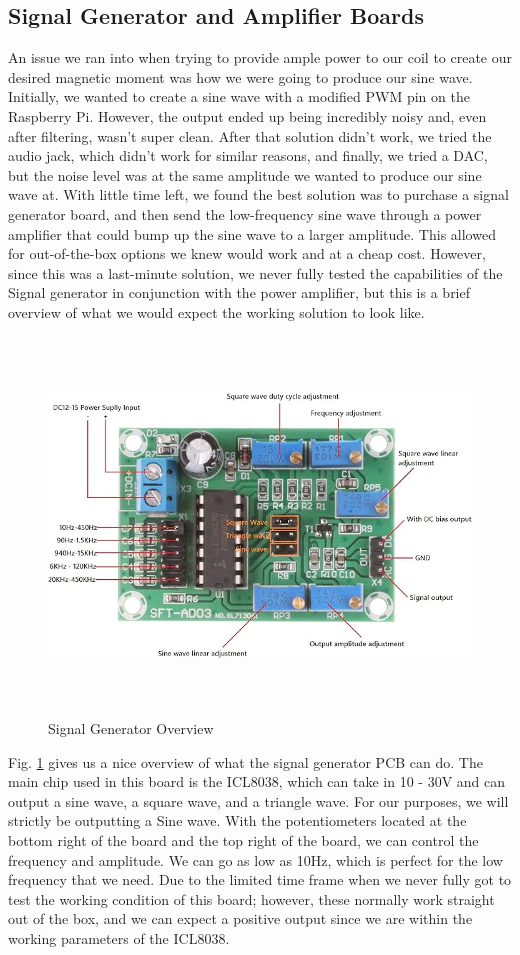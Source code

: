 \subsection{Signal Generator and Amplifier Boards}
An issue we ran into when trying to provide ample power to our coil to create our desired magnetic moment was how we were going to produce our sine wave. Initially, we wanted to create a sine wave with a modified PWM pin on the Raspberry Pi. However, the output ended up being incredibly noisy and, even after filtering, wasn't super clean. After that solution didn't work, we tried the audio jack, which didn't work for similar reasons, and finally, we tried a DAC, but the noise level was at the same amplitude we wanted to produce our sine wave at. With little time left, we found the best solution was to purchase a signal generator board, and then send the low-frequency sine wave through a power amplifier that could bump up the sine wave to a larger amplitude. This allowed for out-of-the-box options we knew would work and at a cheap cost. However, since this was a last-minute solution, we never fully tested the capabilities of the Signal generator in conjunction with the power amplifier, but this is a brief overview of what we would expect the working solution to look like.
\begin{figure}[H]
    \centering
    \includegraphics[height=10cm]{Signal Generator.jpg}
    \caption{Signal Generator Overview}
    \label{fig:Signal Generator}
\end{figure}
Fig. \ref{fig:Signal Generator} gives us a nice overview of what the signal generator PCB can do. The main chip used in this board is the ICL8038, which can take in 10 - 30V and can output a sine wave, a square wave, and a triangle wave. For our purposes, we will strictly be outputting a Sine wave. With the potentiometers located at the bottom right of the board and the top right of the board, we can control the frequency and amplitude. We can go as low as 10Hz, which is perfect for the low frequency that we need. Due to the limited time frame when we never fully got to test the working condition of this board; however, these normally work straight out of the box, and we can expect a positive output since we are within the working parameters of the ICL8038.

